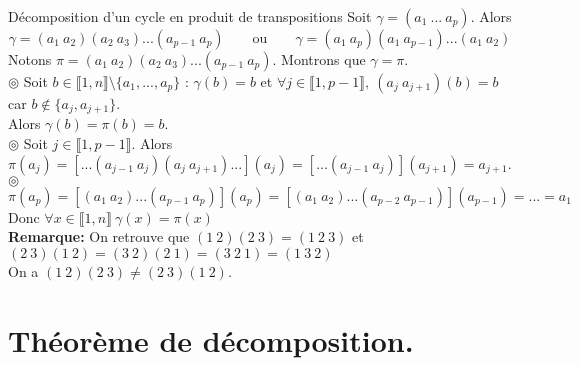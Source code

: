 \documentclass[11pt]{article}
\newcommand*{\lb}{\llbracket}
\newcommand*{\rb}{\rrbracket}
\newcommand*{\n}{\\[0.2cm]}
\newcommand{\0}{\varnothing}
\newcommand*{\g}{\gamma}
\begin{document}
\begin{lem}{Décomposition d'un cycle en produit de transpositions}{}
    Soit $\g=(a_1~...~a_p)$. Alors
    \begin{equation*}
        \g=(a_1~a_2)(a_2~a_3)...(a_{p-1}~a_p) \qquad \text{ou} \qquad \g=(a_1~a_p)(a_1~a_{p-1})...(a_1~a_2)
    \end{equation*}
    \tcblower
    Notons $\pi=(a_1~a_2)(a_2~a_3)...(a_{p-1}~a_p)$. Montrons que $\g=\pi$.\\
    $\circledcirc$ Soit $b\in\lb1,n\rb\setminus\{a_1,...,a_p\}$ : $\g(b)=b$ et $\forall j \in \lb1,p-1\rb, ~ (a_j~a_{j+1})(b)=b$ car $b\notin\{a_j,a_{j+1}\}$.\\
    Alors $\gamma(b)=\pi(b)=b$.\\
    $\circledcirc$ Soit $j\in\lb1,p-1\rb$. Alors $\pi(a_j)=\left[...(a_{j-1}~a_j)(a_j~a_{j+1})...\right](a_j)=\left[...(a_{j-1}~a_j)\right](a_{j+1})=a_{j+1}$.\\
    $\circledcirc$ $\pi(a_p)=[(a_1~a_2)...(a_{p-1}~a_p)](a_p)=[(a_1~a_2)...(a_{p-2}~a_{p-1})](a_{p-1})=...=a_1$\\
    Donc $\forall x \in \lb1,n\rb ~ \g(x)=\pi(x)$\n
    \textbf{Remarque:} On retrouve que $(1~2)(2~3)=(1~2~3)$ et $(2~3)(1~2) = (3~2)(2~1)=(3~2~1)=(1~3~2)$\\
    On a $(1~2)(2~3)\neq(2~3)(1~2)$.
\end{lem}

\section{Théorème de décomposition.}
\end{document}
